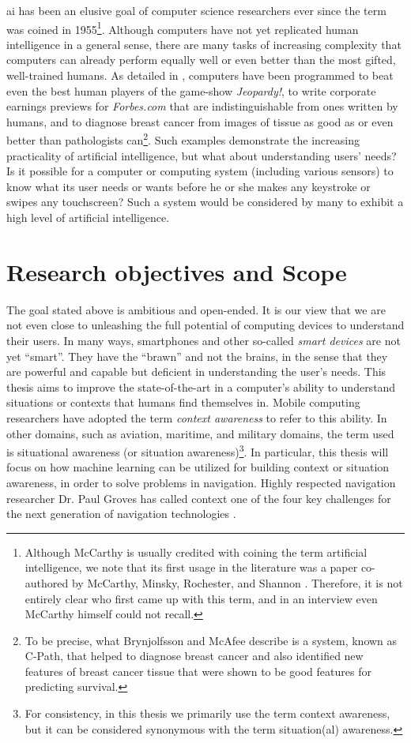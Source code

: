 \gls{ai} has been an elusive goal of computer science researchers ever since the term was coined in 1955\footnote{Although McCarthy is usually credited with coining the term artificial intelligence, we note that its first usage in the literature was a paper co-authored by McCarthy, Minsky, Rochester, and Shannon \cite{McCarthy1955}. Therefore, it is not entirely clear who first came up with this term, and in an interview even McCarthy himself could not recall\cite{crevier1993ai}.%
}. Although computers have not yet replicated human intelligence in a general sense, there are many tasks of increasing complexity that computers can already perform equally well or even better than the most gifted, well-trained humans. As detailed in \cite{brynjolfsson_2014}, computers have been programmed to beat even the best human players of the game-show \emph{Jeopardy!}, to write corporate earnings previews for \emph{Forbes.com} that are indistinguishable from ones written by humans, and to diagnose breast cancer from images of tissue as good as or even better than pathologists can\footnote{To be precise, what Brynjolfsson and McAfee describe is a system, known as C-Path, that helped to diagnose breast cancer and also identified new features of breast cancer tissue that were shown to be good features for predicting survival.}. Such examples demonstrate the increasing practicality of artificial intelligence, but what about understanding users' needs? Is it possible for a computer or computing system (including various sensors) to know what its user needs or wants before he or she makes any keystroke or swipes any touchscreen? Such a system would be considered by many to exhibit a high level of artificial intelligence.

\section{Research objectives and Scope}
\label{sec:objectives}

The goal stated above is ambitious and open-ended. It is our view that we are not even close to unleashing the full potential of computing devices to understand their users. In many ways, smartphones and other so-called \emph{smart devices} are not yet ``smart''. They have the ``brawn'' and not the brains, in the sense that they are powerful and capable but deficient in understanding the user's needs. This thesis aims to improve the state-of-the-art in a computer's ability to understand situations or contexts that humans find themselves in. Mobile computing researchers have adopted the term \emph{context awareness} to refer to this ability. In other domains, such as aviation, maritime, and military domains, the term used is situational awareness (or situation awareness)\footnote{For consistency, in this thesis we primarily use the term context awareness, but it can be considered synonymous with the term situation(al) awareness.}. In particular, this thesis will focus on how machine learning can be utilized for building context or situation awareness, in order to solve problems in navigation. Highly respected navigation researcher Dr. Paul Groves has called context one of the four key challenges for the next generation of navigation technologies \cite{Groves2014}.

